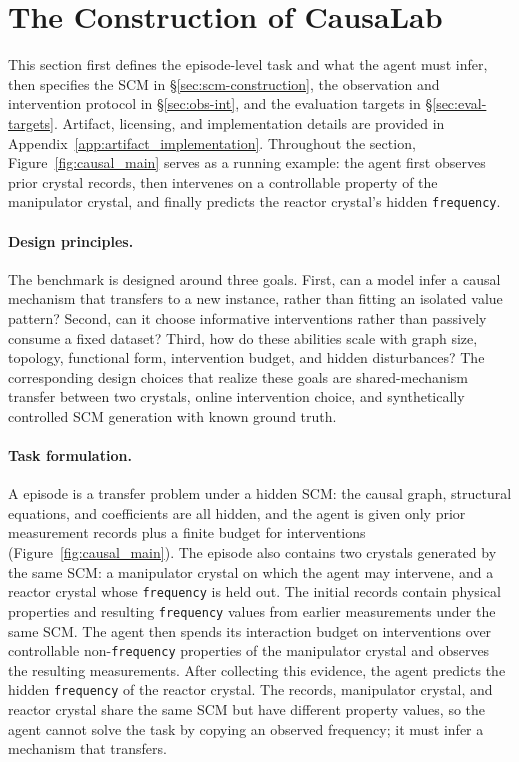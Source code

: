 \section{The Construction of CausaLab}
\label{sec:benchmark}

This section first defines the episode-level task and what the agent must
infer, then specifies the SCM in \S\ref{sec:scm-construction}, the observation
and intervention protocol in \S\ref{sec:obs-int}, and the evaluation targets in
\S\ref{sec:eval-targets}. Artifact, licensing, and implementation details
are provided in Appendix~\ref{app:artifact_implementation}.
Throughout the section, Figure~\ref{fig:causal_main} serves as a running
example: the agent first observes prior crystal records, then intervenes on a
controllable property of the manipulator crystal, and finally predicts the
reactor crystal's hidden \texttt{frequency}.

\paragraph{Design principles.}
The benchmark is designed around three goals. First, can a model infer a
causal mechanism that transfers to a new instance, rather than fitting an
isolated value pattern? Second, can it choose informative interventions rather
than passively consume a fixed dataset? Third, how do these abilities scale
with graph size, topology, functional form, intervention budget, and hidden
disturbances? The corresponding design choices that realize these goals are
shared-mechanism transfer between two crystals, online intervention choice,
and synthetically controlled SCM generation with known ground truth.

\paragraph{Task formulation.}
A \projectname{} episode is a transfer problem under a hidden SCM: the causal
graph, structural equations, and coefficients are all hidden, and the agent is
given only prior measurement records plus a finite budget for interventions
(Figure~\ref{fig:causal_main}). The episode also contains two crystals
generated by the same SCM: a manipulator crystal on which the agent may
intervene, and a reactor crystal whose \texttt{frequency} is held out. The
initial records contain physical properties and resulting \texttt{frequency}
values from earlier measurements under the same SCM. The agent then spends its interaction budget on
interventions over controllable non-\texttt{frequency} properties of the
manipulator crystal and observes the resulting measurements. After collecting
this evidence, the agent predicts the hidden \texttt{frequency} of the reactor
crystal. The records, manipulator crystal, and reactor crystal share the same
SCM but have different property values, so the agent cannot solve the task by
copying an observed frequency; it must infer a mechanism that transfers.

